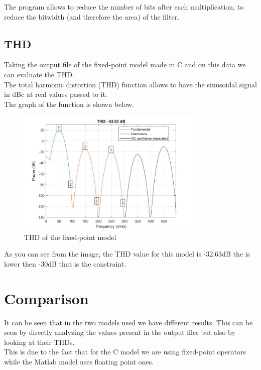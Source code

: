 The program allows to reduce the number of bits after each multiplication, to reduce the bitwidth (and therefore the area) of the filter.\\

\subsection{THD}
Taking the output file of the fixed-point model made in C and on this data we can evaluate the THD.\\
The total harmonic distortion (THD) function allows to have the sinusoidal signal in dBc at real values passed to it.\\
The graph of the function is shown below.\\

\begin{figure}[H]
	\centering
	\includegraphics[width=\textwidth, height=6cm]{img/thdc.jpg} 
	\caption{THD of the fixed-point model}
	\label{fig:THD} 
\end{figure}

As you can see from the image, the THD value for this model is -32.63dB the is lower then -30dB that is the constraint.\\

\section{Comparison}

It can be seen that in the two models used we have different results.
This can be seen by directly analyzing the values present in the output files but also by looking at their THDs.\\
This is due to the fact that for the C model we are using fixed-point operators while the Matlab model uses floating point ones.\\